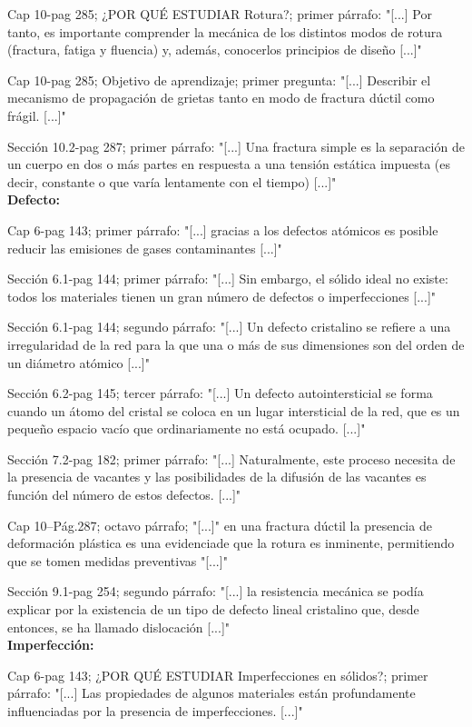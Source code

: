 \documentclass[12pt,a4paper]{article}
\begin{document}
Cap 10-pag 285; ¿POR QUÉ ESTUDIAR Rotura?; primer párrafo: "[...] Por tanto, es importante
comprender la mecánica de los distintos modos de rotura (fractura, fatiga y fluencia) y, además, conocerlos principios de diseño [...]"

Cap 10-pag 285; Objetivo de aprendizaje; primer pregunta: "[...] Describir el mecanismo de propagación de grietas tanto en modo de fractura dúctil como frágil. [...]"

Sección 10.2-pag 287; primer párrafo: "[...] Una fractura simple es la separación de un cuerpo en dos o más partes en respuesta a una tensión estática impuesta (es decir, constante o que varía lentamente con el tiempo) [...]"\\[0.1cm]

\textbf{Defecto:}

Cap 6-pag 143; primer párrafo: "[...] gracias a los defectos atómicos es posible reducir las emisiones de gases contaminantes [...]"

Sección 6.1-pag 144; primer párrafo: "[...] Sin embargo, el sólido ideal no existe: todos los materiales tienen un gran número de defectos o imperfecciones [...]"

Sección 6.1-pag 144; segundo párrafo: "[...] Un defecto cristalino se refiere a una irregularidad de la red para la que una o más de sus dimensiones son del orden de un diámetro atómico [...]"

Sección 6.2-pag 145; tercer párrafo: "[...] Un defecto autointersticial se forma cuando un átomo del cristal se coloca en un lugar intersticial de la red, que es un pequeño espacio vacío que ordinariamente no está ocupado. [...]"

Sección 7.2-pag 182; primer párrafo: "[...] Naturalmente, este proceso necesita de la presencia de vacantes y las posibilidades de la difusión de las vacantes es función del número de estos defectos. [...]"

Cap 10–Pág.287; octavo párrafo; "[...]" en una fractura dúctil la presencia de deformación plástica es una evidenciade que la rotura es inminente, permitiendo que se tomen medidas preventivas "[...]" 

Sección 9.1-pag 254; segundo párrafo: "[...] la resistencia mecánica se podía explicar por la existencia de un tipo de defecto lineal cristalino que, desde entonces, se ha llamado dislocación [...]"\\[0.1cm]

\textbf{Imperfección:}

Cap 6-pag 143; ¿POR QUÉ ESTUDIAR Imperfecciones en sólidos?; primer párrafo: "[...] Las propiedades de algunos materiales están profundamente influenciadas por la presencia de imperfecciones. [...]"
\end{document}
